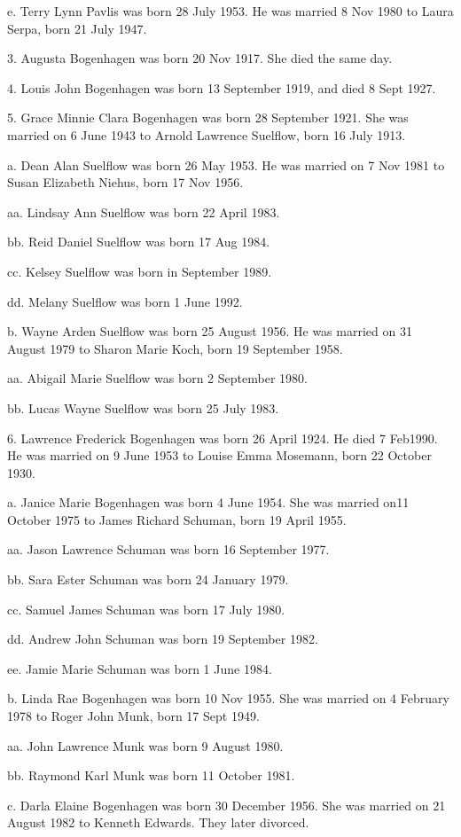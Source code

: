 \documentclass[a4paper]{article}
\begin{document}
e. Terry Lynn Pavlis was born 28 July 1953.  He was married 8 Nov 1980 to Laura Serpa, born 21 July 1947.

3. Augusta Bogenhagen was born 20 Nov 1917. She died the same day.

4. Louis John Bogenhagen was born 13 September 1919, and died 8 Sept 1927.

5. Grace Minnie Clara Bogenhagen was born 28 September 1921.  She was married on 6 June 1943 to Arnold Lawrence Suelflow, born 16 July 1913.

a. Dean Alan Suelflow was born 26 May 1953.  He was married on 7 Nov 1981 to Susan Elizabeth Niehus, born 17 Nov 1956.

aa. Lindsay Ann Suelflow was born 22 April 1983.

bb. Reid Daniel Suelflow was born 17 Aug 1984.

cc. Kelsey Suelflow was born in September 1989.

dd. Melany Suelflow was born 1 June 1992.

b. Wayne Arden Suelflow was born 25 August 1956.  He was married on 31 August 1979 to Sharon Marie Koch, born 19 September 1958.

aa. Abigail Marie Suelflow was born 2 September 1980.

bb. Lucas Wayne Suelflow was born 25 July 1983.

6. Lawrence Frederick Bogenhagen was born 26 April 1924.  He died 7 Feb1990. He was married on 9 June 1953 to Louise Emma Mosemann, born 22 October 1930.

a. Janice Marie Bogenhagen was born 4 June 1954.  She was married on11 October 1975 to James Richard Schuman,  born 19 April 1955.

aa. Jason Lawrence Schuman was born 16 September 1977.

bb. Sara Ester Schuman was born 24 January 1979.

cc. Samuel James Schuman was born 17 July 1980. 

dd. Andrew John Schuman was born 19 September 1982.

ee. Jamie Marie Schuman was born 1 June 1984. 

b. Linda Rae Bogenhagen was born 10 Nov 1955.  She was married on 4 February 1978 to Roger John Munk, born 17 Sept 1949.

aa. John Lawrence Munk was born 9 August 1980.

bb. Raymond Karl Munk was born 11 October 1981.

c. Darla Elaine Bogenhagen was born 30 December 1956. She was married on 21 August 1982 to Kenneth Edwards.  They later divorced.
\end{document}
